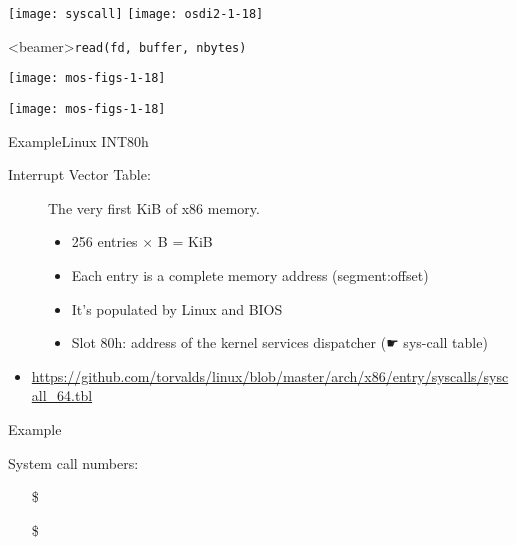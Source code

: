 \begin{center}
  \texttt{[image: syscall]}\quad
  \texttt{[image: osdi2-1-18]}
\end{center}


\begin{frame}<beamer>{\texttt{read(fd, buffer, nbytes)}}
  \begin{minipage}{.3\linewidth}
  \end{minipage}\quad
  \begin{minipage}{.65\linewidth}
    \texttt{[image: mos-figs-1-18]}
  \end{minipage}
\end{frame}

\begin{center}
  \texttt{[image: mos-figs-1-18]}
\end{center}  

\begin{frame}{Example}{Linux INT80h}
  \begin{description}
  \item[Interrupt Vector Table:] The very first \unit[1]{KiB} of x86 memory. 
    \begin{itemize} 
    \item 256 entries $\times$ \unit[4]{B} = \unit[1]{KiB}
    \item Each entry is a complete memory address (segment:offset)
    \item It's populated by Linux and BIOS
    \item Slot 80h: address of the kernel services dispatcher (☛ sys-call table)
    \end{itemize}
  \end{description}
\end{frame}

\begin{itemize}
\item \url{https://github.com/torvalds/linux/blob/master/arch/x86/entry/syscalls/syscall_64.tbl}
\end{itemize}

\begin{frame}{Example}
  \begin{center}
  \end{center}
  System call numbers:
  \begin{itemize}
  \item[\$] 
  \item[\$] 
  \end{itemize}
\end{frame}

